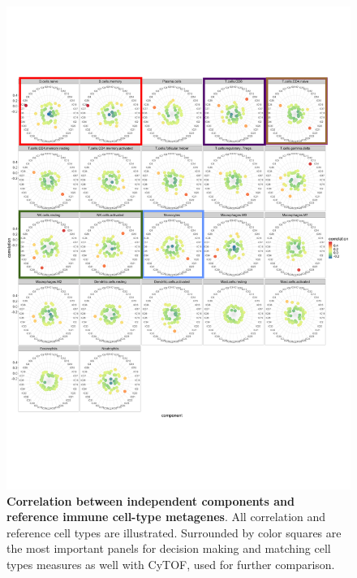 \documentclass[12pt,]{book}
\theoremstyle{definition}
\theoremstyle{definition}
\theoremstyle{definition}
\theoremstyle{remark}
\begin{document}
\begin{figure}

{\centering \includegraphics[width=1\linewidth]{figures-ext/radarBlood} 

}

\caption[Correlation between independent components and reference immune cell-type metagenes]{\textbf{Correlation between independent components
and reference immune cell-type metagenes}. All correlation and reference
cell types are illustrated. Surrounded by color squares are the most
important panels for decision making and matching cell types measures as
well with CyTOF, used for further comparison.}\label{fig:radarB}
\end{figure}
\end{document}
